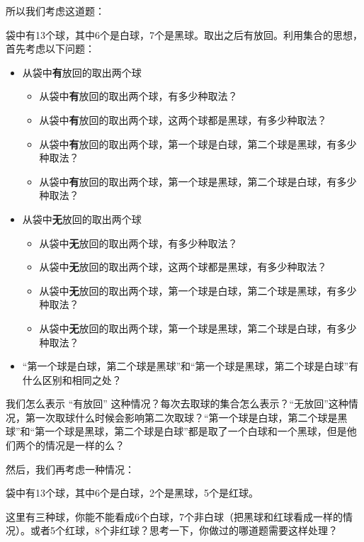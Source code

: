 \documentclass[lang=cn,math=mtpro2,11pt,scheme=chinese,pad]{elegantbook}
\begin{document}
所以我们考虑这道题：
\begin{example}\label{example:ex1}
  袋中有13个球，其中6个是白球，7个是黑球。取出之后有放回。利用集合的思想，首先考虑以下问题：
  \begin{itemize}
    \item 从袋中\textbf{有}放回的取出两个球
    \begin{itemize}
      \item 从袋中\textbf{有}放回的取出两个球，有多少种取法？
      \item 从袋中\textbf{有}放回的取出两个球，这两个球都是黑球，有多少种取法？
      \item 从袋中\textbf{有}放回的取出两个球，第一个球是白球，第二个球是黑球，有多少种取法？
      \item 从袋中\textbf{有}放回的取出两个球，第一个球是黑球，第二个球是白球，有多少种取法？
    \end{itemize}
    \item 从袋中\textbf{无}放回的取出两个球
    \begin{itemize}
      \item 从袋中\textbf{无}放回的取出两个球，有多少种取法？
      \item 从袋中\textbf{无}放回的取出两个球，这两个球都是黑球，有多少种取法？
      \item 从袋中\textbf{无}放回的取出两个球，第一个球是白球，第二个球是黑球，有多少种取法？
      \item 从袋中\textbf{无}放回的取出两个球，第一个球是黑球，第二个球是白球，有多少种取法？
    \end{itemize}
    \item “第一个球是白球，第二个球是黑球”和“第一个球是黑球，第二个球是白球”有什么区别和相同之处？
  \end{itemize}
\end{example}
\begin{note}
  我们怎么表示 “有放回” 这种情况？每次去取球的集合怎么表示？“无放回”这种情况，第一次取球什么时候会影响第二次取球？“第一个球是白球，第二个球是黑球”和“第一个球是黑球，第二个球是白球”都是取了一个白球和一个黑球，但是他们两个的情况是一样的么？
\end{note}

然后，我们再考虑一种情况：
\begin{example}\label{example:ex1}
  袋中有13个球，其中6个是白球，2个是黑球，5个是红球。
\end{example}
\begin{note}
  这里有三种球，你能不能看成6个白球，7个非白球（把黑球和红球看成一样的情况）。或者5个红球，8个非红球？思考一下，你做过的哪道题需要这样处理？
\end{note}
\end{document}
